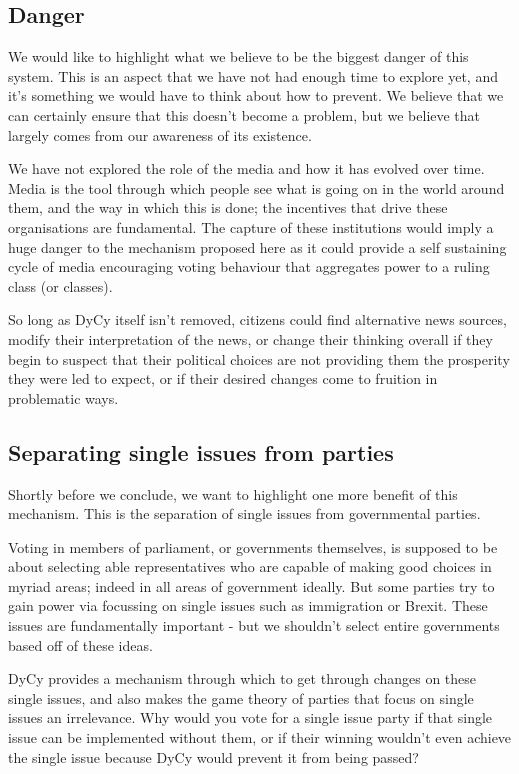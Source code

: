 \documentclass[twoside]{article}
\theoremstyle{definition}
\begin{document}
\subsection{Danger}

We would like to highlight what we believe to be the biggest danger of this system. This is an aspect that we have not had enough time to explore yet, and it’s something we would have to think about how to prevent. We believe that we can certainly ensure that this doesn’t become a problem, but we believe that largely comes from our awareness of its existence.

We have not explored the role of the media and how it has evolved over time. Media is the tool through which people see what is going on in the world around them, and the way in which this is done; the incentives that drive these organisations are fundamental. The capture of these institutions would imply a huge danger to the mechanism proposed here as it could provide a self sustaining cycle of media encouraging voting behaviour that aggregates power to a ruling class (or classes).

So long as DyCy itself isn’t removed, citizens could find alternative news sources, modify their interpretation of the news, or change their thinking overall if they begin to suspect that their political choices are not providing them the prosperity they were led to expect, or if their desired changes come to fruition in problematic ways.

\subsection{Separating single issues from parties}

Shortly before we conclude, we want to highlight one more benefit of this mechanism. This is the separation of single issues from governmental parties.

Voting in members of parliament, or governments themselves, is supposed to be about selecting able representatives who are capable of making good choices in myriad areas; indeed in all areas of government ideally. But some parties try to gain power via focussing on single issues such as immigration or Brexit. These issues are fundamentally important - but we shouldn’t select entire governments based off of these ideas.

DyCy provides a mechanism through which to get through changes on these single issues, and also makes the game theory of parties that focus on single issues an irrelevance. Why would you vote for a single issue party if that single issue can be implemented without them, or if their winning wouldn’t even achieve the single issue because DyCy would prevent it from being passed?
\end{document}
